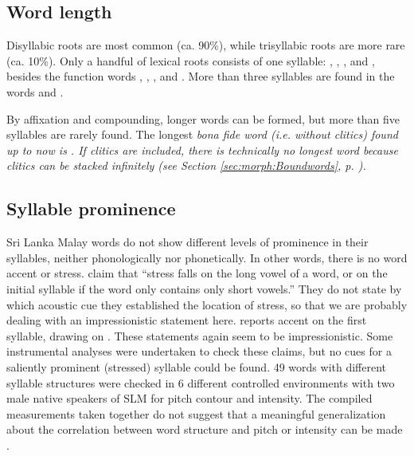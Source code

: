 \subsection{Word length}\label{sec:phon:Wordlength}
Disyllabic roots are most common (ca. 90\%), while trisyllabic roots are more rare (ca. 10\%). Only a handful of lexical roots consists of one syllable: , , ,  and , besides the function words , , ,  and . More than three syllables are found in the words   and . %

By affixation and compounding, longer words can be formed, but more than five syllables are rarely found. The longest \em bona fide \em word (i.e. without clitics) found up to now is . If clitics are included, there is technically no longest word because clitics can be stacked infinitely (see Section \ref{sec:morph:Boundwords}, p. \pageref{sec:morph:Boundwords}).



\subsection{Syllable prominence}\label{sec:phon:Syllableprominence}
Sri Lanka Malay words do not show different levels of prominence in their syllables, neither phonologically nor phonetically. In other words, there is no word accent or stress. \citet{SmithEtAl2004} claim that ``stress falls on the long vowel of a word, or on the initial syllable if the word only contains only short vowels.'' They do not state by which acoustic cue they established the location of stress, so that we are probably dealing with an impressionistic statement here. \citet{Bakker2006} reports accent on the first syllable, drawing on \citet{Robuchon2003}. These statements again seem to be impressionistic. Some instrumental analyses were undertaken to check these claims, but no cues for a saliently prominent (stressed) syllable could be found. 49 words with different syllable structures were checked in 6 different controlled environments with two male native speakers of SLM for pitch contour and intensity. The compiled measurements taken together do not suggest that a meaningful generalization about the correlation between word structure and  pitch or intensity can be made  \citep{ApoussidouEtAl2008}.

